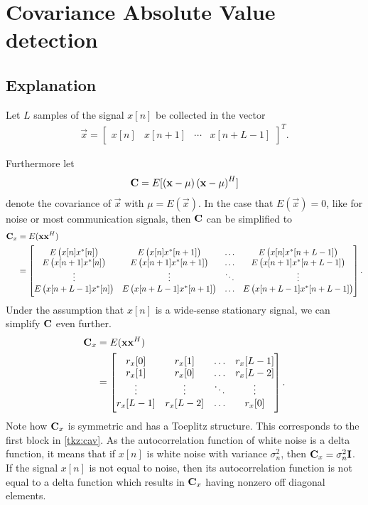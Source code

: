 \documentclass[a4paper, openany, oneside]{memoir}
\begin{document}
\section{Covariance Absolute Value detection}\label{sec:cav_derivation}

\subsection{Explanation}
Let $L$ samples of the signal $x[n]$ be collected in the vector
\begin{align*}
    \vec{x} = \begin{bmatrix}x[n]& x[n+1]& \cdots& x[n+L-1]\end{bmatrix}^T.
\end{align*}

Furthermore let
\begin{align*}
    \boldsymbol{\mathbf{C}} = E[\left(\boldsymbol{\mathbf{x}} - \mu \right)\left(\boldsymbol{\mathbf{x}} - \mu \right)^H]
\end{align*}
denote the covariance of $\vec{x}$ with $\mu = E(\vec{x})$. In the case that $E\left(\vec{x}\right)=0$, like for noise or most communication signals, then $\boldsymbol{\mathbf{C}}$ can be simplified to
\begin{align*}
\boldsymbol{\mathbf{C}}_x &= E(\boldsymbol{\mathbf{x}}\boldsymbol{\mathbf{x}}^H) \\
&= \begin{bmatrix} 
E\left(x[n]x^*[n]\right) & E\left(x[n]x^*[n+1]\right) & \ldots & E\left(x[n]x^*[n+L-1]\right) \\
E\left(x[n+1]x^*[n]\right) & E\left(x[n+1]x^*[n+1]\right) & \ldots & E\left(x[n+1]x^*[n+L-1]\right) \\
\vdots & \vdots & \ddots & \vdots \\
E\left(x[n+L-1]x^*[n]\right) & E\left(x[n+L-1]x^*[n+1]\right) & \ldots & E\left(x[n+L-1]x^*[n+L-1]\right) \\
\end{bmatrix}.
\end{align*}
Under the assumption that $x[n]$ is a wide-sense stationary signal, we can simplify $\boldsymbol{\mathbf{C}}$ even further. 
\begin{align*}
\boldsymbol{\mathbf{C}}_x&= E(\boldsymbol{\mathbf{x}}\boldsymbol{\mathbf{x}}^H) \\
&= \begin{bmatrix} 
r_x[0] & r_x[1] & \ldots & r_x[L-1] \\
r_x[1] & r_x[0] & \ldots & r_x[L-2] \\
\vdots & \vdots & \ddots & \vdots \\
r_x[L-1] & r_x[L-2] & \ldots & r_x[0] \\
\end{bmatrix}.
\end{align*}
Note how $\boldsymbol{\mathbf{C}}_x$ is symmetric and has a Toeplitz structure. This corresponds to the first block in \cref{tkz:cav}. As  the autocorrelation function of white noise is a delta function, it means that  if $x[n]$ is white noise with variance $\sigma_n^2$, then $\boldsymbol{\mathbf{C}}_x = \sigma_n^2\boldsymbol{\mathbf{I}}$.
If the signal $x[n]$ is not equal to noise, then its autocorrelation function is not equal to a delta function which results in $\boldsymbol{\mathbf{C}}_x$ having nonzero off diagonal elements.
\end{document}
